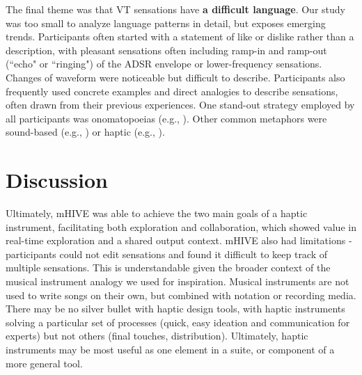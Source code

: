 The final theme was that VT sensations have \textbf{a difficult language}.
Our study was too small to analyze language patterns in detail, but exposes emerging trends.
Participants often started with a statement of like or dislike rather than a description, with
pleasant sensations often including
ramp-in and ramp-out (``echo" or ``ringing") of the ADSR envelope or lower-frequency sensations.
Changes of waveform were noticeable but difficult to describe. %
Participants also frequently 
used concrete examples and direct analogies to describe sensations, often drawn from their previous experiences.
One stand-out strategy employed by all participants  
was  
onomatopoeias (e.g.,  ).
Other common metaphors were sound-based %
(e.g., )
or haptic
(e.g., ).




%
% 
\section{Discussion}
Ultimately,
mHIVE was able to achieve the two main goals of a haptic instrument, facilitating both exploration and collaboration, which showed value in real-time exploration and a shared output context.
mHIVE also had limitations - participants could not edit sensations and found it difficult to keep track of multiple sensations.
This is understandable given the broader context of the musical instrument analogy we used for inspiration.
Musical instruments are not used to write songs on their own, but %
combined with notation or recording media.
There may be no silver bullet with haptic design tools, with haptic instruments solving a particular set of processes (quick, easy ideation and communication for experts) but not others (final touches, distribution).
Ultimately, haptic instruments may be most useful as one element
in a suite, or component of a more general tool.

